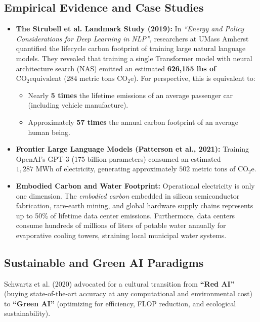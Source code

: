 \documentclass[12pt,a4paper]{article}
\begin{document}
\subsection{Empirical Evidence and Case Studies}
\begin{itemize}[leftmargin=*]
    \item \textbf{The Strubell et al. Landmark Study (2019):} In \textit{``Energy and Policy Considerations for Deep Learning in NLP''}, researchers at UMass Amherst quantified the lifecycle carbon footprint of training large natural language models. They revealed that training a single Transformer model with neural architecture search (NAS) emitted an estimated \textbf{626,155 lbs of $\text{CO}_2\text{equivalent}$} ($284\text{ metric tons CO}_2\text{e}$). For perspective, this is equivalent to:
    \begin{itemize}
        \item Nearly \textbf{5 times} the lifetime emissions of an average passenger car (including vehicle manufacture).
        \item Approximately \textbf{57 times} the annual carbon footprint of an average human being.
    \end{itemize}
    \item \textbf{Frontier Large Language Models (Patterson et al., 2021):} Training OpenAI's GPT-3 (175 billion parameters) consumed an estimated $1,287\text{ MWh}$ of electricity, generating approximately $502\text{ metric tons of CO}_2\text{e}$.
    \item \textbf{Embodied Carbon and Water Footprint:} Operational electricity is only one dimension. The \textit{embodied carbon} embedded in silicon semiconductor fabrication, rare-earth mining, and global hardware supply chains represents up to 50\% of lifetime data center emissions. Furthermore, data centers consume hundreds of millions of liters of potable water annually for evaporative cooling towers, straining local municipal water systems.
\end{itemize}

\subsection{Sustainable and Green AI Paradigms}
Schwartz et al. (2020) advocated for a cultural transition from \textbf{``Red AI''} (buying state-of-the-art accuracy at any computational and environmental cost) to \textbf{``Green AI''} (optimizing for efficiency, FLOP reduction, and ecological sustainability).
\end{document}
